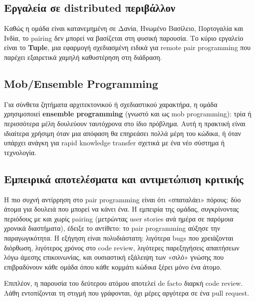 \subsection{Εργαλεία σε distributed
περιβάλλον}\label{ux3b5ux3c1ux3b3ux3b1ux3bbux3b5ux3afux3b1-ux3c3ux3b5-distributed-ux3c0ux3b5ux3c1ux3b9ux3b2ux3acux3bbux3bbux3bfux3bd}

Καθώς η ομάδα είναι κατανεμημένη σε Δανία, Ηνωμένο Βασίλειο, Πορτογαλία
και Ινδία, το pairing δεν μπορεί να βασίζεται στη φυσική παρουσία. Το
κύριο εργαλείο είναι το \textbf{Tuple}, μια εφαρμογή σχεδιασμένη ειδικά
για remote pair programming που παρέχει εξαιρετικά χαμηλή καθυστέρηση
στη διάδραση.

\subsection{Mob/Ensemble Programming}\label{mobensemble-programming}

Για σύνθετα ζητήματα αρχιτεκτονικού ή σχεδιαστικού χαρακτήρα, η ομάδα
χρησιμοποιεί \textbf{ensemble programming} (γνωστό και ως mob
programming): τρία ή περισσότερα μέλη δουλεύουν ταυτόχρονα στο ίδιο
πρόβλημα. Αυτή η πρακτική είναι ιδιαίτερα χρήσιμη όταν μια απόφαση θα
επηρεάσει πολλά μέρη του κώδικα, ή όταν υπάρχει ανάγκη για rapid
knowledge transfer σχετικά με ένα νέο σύστημα ή τεχνολογία.

\subsection{Εμπειρικά αποτελέσματα και αντιμετώπιση
κριτικής}\label{ux3b5ux3bcux3c0ux3b5ux3b9ux3c1ux3b9ux3baux3ac-ux3b1ux3c0ux3bfux3c4ux3b5ux3bbux3adux3c3ux3bcux3b1ux3c4ux3b1-ux3baux3b1ux3b9-ux3b1ux3bdux3c4ux3b9ux3bcux3b5ux3c4ux3ceux3c0ux3b9ux3c3ux3b7-ux3baux3c1ux3b9ux3c4ux3b9ux3baux3aeux3c2}

Η πιο συχνή αντίρρηση στο pair programming είναι ότι «σπαταλάει» πόρους:
δύο άτομα για δουλειά που μπορεί να κάνει ένα. Η εμπειρία της ομάδας,
συγκρίνοντας περιόδους με και χωρίς pairing (μετρώντας user stories ανά
ημέρα σε παρόμοια χρονικά διαστήματα), έδειξε το αντίθετο: το pair
programming αύξησε την παραγωγικότητα. Η εξήγηση είναι πολυδιάστατη:
λιγότερα bugs που χρειάζονται διόρθωση, λιγότερος χρόνος στο code
review, λιγότερες παρεξηγήσεις απαιτήσεων λόγω άμεσης επικοινωνίας, και
ουσιαστική εξάλειψη των «σιλό» γνώσης που επιβραδύνουν κάθε ομάδα όπου
κάθε κομμάτι κώδικα ξέρει μόνο ένα άτομο.

Επιπλέον, η παρουσία του δεύτερου ατόμου αποτελεί de facto διαρκή code
review. Λάθη εντοπίζονται τη στιγμή που γράφονται, όχι μέρες αργότερα σε
ένα pull request.

